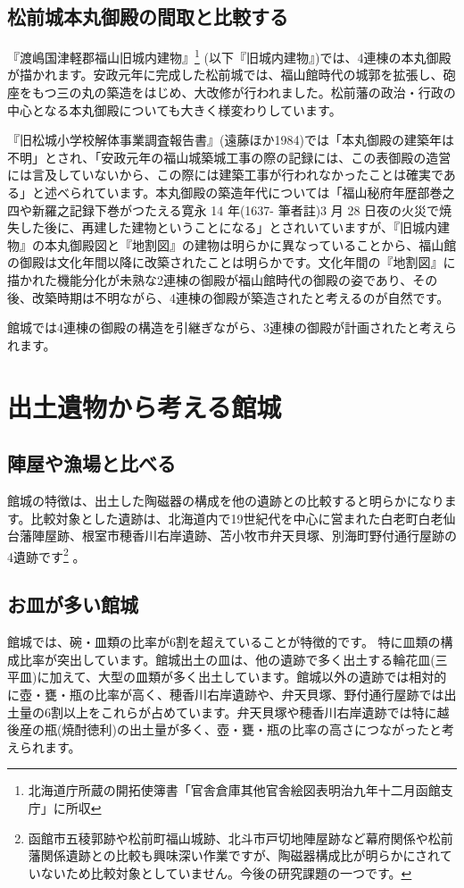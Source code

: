 \documentclass[11pt,report]{jsbook}
\begin{document}
\section{松前城本丸御殿の間取と比較する}
『渡嶋国津軽郡福山旧城内建物』\footnote{
北海道庁所蔵の開拓使簿書「官舎倉庫其他官舎絵図表明治九年十二月函館支庁」に所収
}
(以下『旧城内建物』)では、4連棟の本丸御殿が描かれます。安政元年に完成した松前城では、福山館時代の城郭を拡張し、砲座をもつ三の丸の築造をはじめ、大改修が行われました。松前藩の政治・行政の中心となる本丸御殿についても大きく様変わりしています。

『旧松城小学校解体事業調査報告書』(遠藤ほか1984)では「本丸御殿の建築年は不明」とされ、「安政元年の福山城築城工事の際の記録には、この表御殿の造営には言及していないから、この際には建築工事が行われなかったことは確実である」と述べられています。本丸御殿の築造年代については「福山秘府年歴部巻之四や新羅之記録下巻がつたえる寛永 14 年(1637- 筆者註)3 月 28 日夜の火災で焼失した後に、再建した建物ということになる」とされいていますが、『旧城内建物』の本丸御殿図と『地割図』の建物は明らかに異なっていることから、福山館の御殿は文化年間以降に改築されたことは明らかです。文化年間の『地割図』に描かれた機能分化が未熟な2連棟の御殿が福山館時代の御殿の姿であり、その後、改築時期は不明ながら、4連棟の御殿が築造されたと考えるのが自然です。

館城では4連棟の御殿の構造を引継ぎながら、3連棟の御殿が計画されたと考えられます。


\newpage
\chapter{出土遺物から考える館城}
\section{陣屋や漁場と比べる}
館城の特徴は、出土した陶磁器の構成を他の遺跡との比較すると明らかになります。比較対象とした遺跡は、北海道内で19世紀代を中心に営まれた白老町白老仙台藩陣屋跡、根室市穂香川右岸遺跡、苫小牧市弁天貝塚、別海町野付通行屋跡の4遺跡です\footnote{
函館市五稜郭跡や松前町福山城跡、北斗市戸切地陣屋跡など幕府関係や松前藩関係遺跡との比較も興味深い作業ですが、陶磁器構成比が明らかにされていないため比較対象としていません。今後の研究課題の一つです。
}
。

\section{お皿が多い館城}
館城では、碗・皿類の比率が6割を超えていることが特徴的です。 特に皿類の構成比率が突出しています。館城出土の皿は、他の遺跡で多く出土する輪花皿(三平皿)に加えて、大型の皿類が多く出土しています。館城以外の遺跡では相対的に壺・甕・瓶の比率が高く、穂香川右岸遺跡や、弁天貝塚、野付通行屋跡では出土量の6割以上をこれらが占めています。弁天貝塚や穂香川右岸遺跡では特に越後産の瓶(焼酎徳利)の出土量が多く、壺・甕・瓶の比率の高さにつながったと考えられます。
\end{document}
